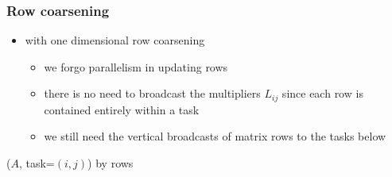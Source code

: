 \begin{frame}[fragile]
%
  \frametitle{Row coarsening}
%
  \begin{itemize}
%
  \item with one dimensional row coarsening
    \begin{itemize}
    \item we forgo parallelism in updating rows
    \item there is no need to broadcast the multipliers $L_{ij}$ since each row is contained
      entirely within a task
    \item we still need the vertical broadcasts of matrix rows to the tasks below
    \end{itemize}
%
  \end{itemize}
%
  \begin{center}
    \begin{minipage}{.85\linewidth}
      \begin{algorithm}[H]
        \label{alg:pLU-ij-rows}
%
        \DontPrintSemicolon
        \SetAlCapHSkip{0ex}
%
        \caption{\lu($A$, task=$(i,j)$) by rows}
%
% 
      \end{algorithm}
    \end{minipage}
  \end{center}
% 
\end{frame}

